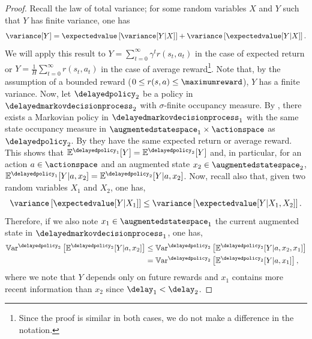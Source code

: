 \begin{proof}
    Recall the law of total variance; for some random variables $X$ and $Y$ such that $Y$ has finite variance, one has
    \begin{align*}
        \variance[Y] = \expectedvalue\left[\variance[Y\vert X]\right] + \variance\left[\expectedvalue[Y\vert X]\right].
    \end{align*}
    We will apply this result to $\textstyle Y=\sum_{t=0}^\infty \gamma^{t} r(s_{t},a_{t})$ in the case of expected return or $\textstyle Y=\frac{1}{H}\sum_{t=0}^\infty r(s_{t},a_{t})$ in the case of average reward\footnote{Since the proof is similar in both cases, we do not make a difference in the notation.}.
    Note that, by the assumption of a bounded reward ($0\le r(s,a)\le \maximumreward$), $Y$ has a finite variance. 
    Now, let $\delayedpolicy_2$ be a policy in $\delayedmarkovdecisionprocess_{2}$ with $\sigma$-finite occupancy measure.
    By , there exists a Markovian policy in $\delayedmarkovdecisionprocess_{1}$ with the same state occupancy measure in $\augmentedstatespace_1\times\actionspace$ as  $\delayedpolicy_2$.
    By \cite[Lemma~1]{laroche2022non} they have the same expected return or average reward.
    This shows that $\mathbb{E}^{\delayedpolicy_1}[Y]=\mathbb{E}^{\delayedpolicy_2}[Y]$ and, in particular, for an action $a\in\actionspace$ and an augmented state $x_2\in\augmentedstatespace_2$, $\mathbb{E}^{\delayedpolicy_1}[Y\vert a,x_2]=\mathbb{E}^{\delayedpolicy_2}[Y\vert a,x_2]$.
    Now, recall also that, given two random variables $X_1$ and $X_2$, one has,
    \begin{align*}
        \variance\left[\expectedvalue[Y\vert X_1]\right]\le \variance\left[\expectedvalue[Y\vert X_1,X_2]\right].
    \end{align*}
    Therefore, if we also note $x_1\in\augmentedstatespace_1$ the current augmented state in $\delayedmarkovdecisionprocess_1$, one has,
    \begin{align*}
        \mathbb{V}\mathrm{ar}^{\delayedpolicy_2}\left[\mathbb{E}^{\delayedpolicy_2}[Y\vert a,x_2]\right] &\le \mathbb{V}\mathrm{ar}^{\delayedpolicy_2}\left[\mathbb{E}^{\delayedpolicy_2}[Y\vert a,x_2,x_1]\right]
        \\
        &=\mathbb{V}\mathrm{ar}^{\delayedpolicy_2}\left[\mathbb{E}^{\delayedpolicy_2}[Y\vert a,x_1]\right],
    \end{align*}
    where we note that $Y$ depends only on future rewards and $x_1$ contains more recent information than $x_2$ since $\delay_1<\delay_2$. 

\end{proof}
